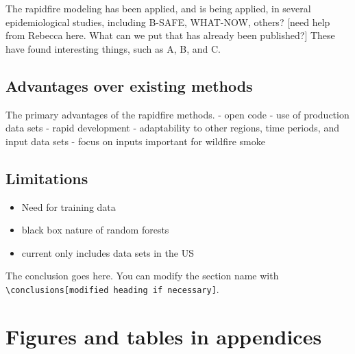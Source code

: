 \documentclass[gmd, manuscript]{copernicus}
\providecommand{\tightlist}{%
  \setlength{\itemsep}{0pt}\setlength{\parskip}{0pt}}
\begin{document}
The rapidfire modeling has been applied, and is being applied, in
several epidemiological studies, including B-SAFE, WHAT-NOW, others?
{[}need help from Rebecca here. What can we put that has already been
published?{]} These have found interesting things, such as A, B, and C.

\subsection{Advantages over existing methods}

The primary advantages of the rapidfire methods. - open code - use of
production data sets - rapid development - adaptability to other
regions, time periods, and input data sets - focus on inputs important
for wildfire smoke

\subsection{Limitations}

\begin{itemize}
\tightlist
\item
  Need for training data
\item
  black box nature of random forests
\item
  current only includes data sets in the US
\end{itemize}

\conclusions[Conclusions]

The conclusion goes here. You can modify the section name with
\texttt{\textbackslash{}conclusions{[}modified\ heading\ if\ necessary{]}}.







\appendix
\section{Figures and tables in appendices}
\end{document}
